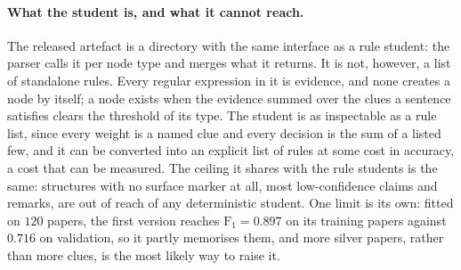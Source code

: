 \documentclass[10pt]{article}
\begin{document}
\paragraph{What the student is, and what it cannot reach.}
The released artefact is a directory with the same interface as a rule student: the parser calls it per node type and merges what it returns. It is not, however, a list of standalone rules. Every regular expression in it is evidence, and none creates a node by itself; a node exists when the evidence summed over the clues a sentence satisfies clears the threshold of its type. The student is as inspectable as a rule list, since every weight is a named clue and every decision is the sum of a listed few, and it can be converted into an explicit list of rules at some cost in accuracy, a cost that can be measured. The ceiling it shares with the rule students is the same: structures with no surface marker at all, most low-confidence claims and remarks, are out of reach of any deterministic student. One limit is its own: fitted on $120$ papers, the first version reaches $\mathrm{F}_1=0.897$ on its training papers against $0.716$ on validation, so it partly memorises them, and more silver papers, rather than more clues, is the most likely way to raise it.
\end{document}

